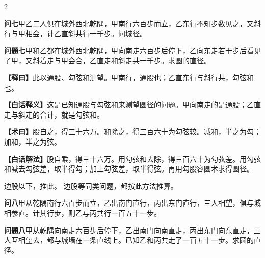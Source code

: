 \documentclass[11pt,a4paper]{article}
\newcommand{\WenQuestion}[1]{\textbf{\textcolor{classicalcolor}{#1}}}
\newcommand{\BaiQuestion}[1]{\textbf{\textcolor{moderncolor}{#1}}}
\newcommand{\WenExplain}{\textcolor{classicalcolor}{\textbf{【释曰】}}}
\newcommand{\BaiExplain}{\textcolor{moderncolor}{\textbf{【白话释义】}}}
\newcommand{\WenMethod}{\textcolor{classicalcolor}{\textbf{【术曰】}}}
\newcommand{\BaiMethod}{\textcolor{moderncolor}{\textbf{【白话解法】}}}
\begin{document}
\vspace{0.5em}

\begin{paracol}{2}

\switchcolumn*
\begin{tcolorbox}[colback=red!3,colframe=red!30!black,boxrule=0.3pt]
\WenQuestion{问七}\quad 甲乙二人俱在城外西北乾隅，甲南行六百步而立，乙东行不知步数见之，又斜行与甲相会，计乙直斜共行一千步。问城径。
\end{tcolorbox}
\switchcolumn
\begin{tcolorbox}[colback=blue!3,colframe=blue!30!black,boxrule=0.3pt]
\BaiQuestion{问题七}\quad 甲和乙都在城外西北乾隅，甲向南走六百步后停下，乙向东走若干步后看见了甲，又斜着走与甲会合，乙直走和斜走共一千步。求圆的直径。
\end{tcolorbox}

\switchcolumn*
\begin{tcolorbox}[colback=red!5,colframe=red!30!black,boxrule=0.3pt]
\WenExplain\quad 此以通股、勾弦和测望。甲南行，通股也；乙直东行与斜行共，勾弦和也。
\end{tcolorbox}
\switchcolumn
\begin{tcolorbox}[colback=blue!5,colframe=blue!30!black,boxrule=0.3pt]
\BaiExplain\quad 这是已知通股与勾弦和来测望圆径的问题。甲向南走的是通股；乙直走与斜走的合计，就是勾弦和。
\end{tcolorbox}

\switchcolumn*
\begin{tcolorbox}[colback=red!5,colframe=red!40!black,boxrule=0.3pt]
\WenMethod\quad 股自之，得三十六万。和除之，得三百六十为勾弦较。减和，半之为勾；加和，半之为弦。
\end{tcolorbox}
\switchcolumn
\begin{tcolorbox}[colback=blue!5,colframe=blue!40!black,boxrule=0.3pt]
\BaiMethod\quad 股自乘，得三十六万。用勾弦和去除，得三百六十为勾弦差。用勾弦和减去勾弦差，取半得勾；加上勾弦差，取半得弦。再用勾股容圆术求得圆径。
\end{tcolorbox}

\switchcolumn*
\small 边股以下，推此。
\switchcolumn
\small 边股等同类问题，都按此方法推算。

\vspace{0.8em}

\switchcolumn*
\begin{tcolorbox}[colback=red!3,colframe=red!30!black,boxrule=0.3pt]
\WenQuestion{问八}\quad 甲从乾隅南行六百步而立，乙出南门直行，丙出东门直行，三人相望，俱与城相参直。计其行步，则乙与丙共行一百五十一步。
\end{tcolorbox}
\switchcolumn
\begin{tcolorbox}[colback=blue!3,colframe=blue!30!black,boxrule=0.3pt]
\BaiQuestion{问题八}\quad 甲从乾隅向南走六百步后停下，乙出南门向南直走，丙出东门向东直走，三人互相望去，都与城墙在一条直线上。已知乙和丙共走了一百五十一步。求圆的直径。
\end{tcolorbox}


\end{paracol}
\end{document}
